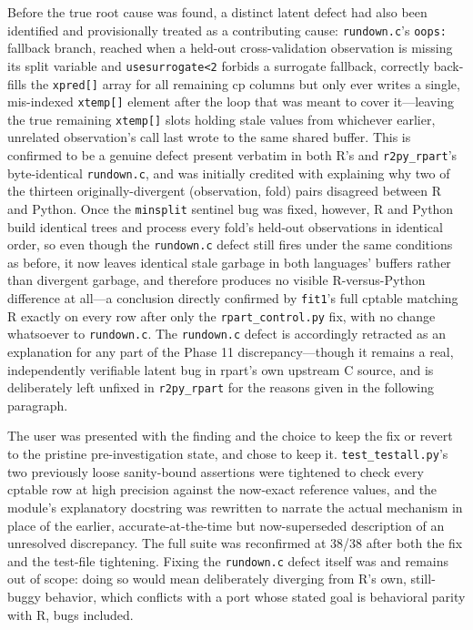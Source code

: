 \documentclass[12pt]{article}
\begin{document}
Before the true root cause was found, a distinct latent defect had also been identified and provisionally treated as a contributing cause: \texttt{rundown.c}'s \texttt{oops:} fallback branch, reached when a held-out cross-validation observation is missing its split variable and \texttt{usesurrogate<2} forbids a surrogate fallback, correctly back-fills the \texttt{xpred[]} array for all remaining cp columns but only ever writes a single, mis-indexed \texttt{xtemp[]} element after the loop that was meant to cover it---leaving the true remaining \texttt{xtemp[]} slots holding stale values from whichever earlier, unrelated observation's call last wrote to the same shared buffer. This is confirmed to be a genuine defect present verbatim in both R's and \texttt{r2py\_rpart}'s byte-identical \texttt{rundown.c}, and was initially credited with explaining why two of the thirteen originally-divergent (observation, fold) pairs disagreed between R and Python. Once the \texttt{minsplit} sentinel bug was fixed, however, R and Python build identical trees and process every fold's held-out observations in identical order, so even though the \texttt{rundown.c} defect still fires under the same conditions as before, it now leaves identical stale garbage in both languages' buffers rather than divergent garbage, and therefore produces no visible R-versus-Python difference at all---a conclusion directly confirmed by \texttt{fit1}'s full cptable matching R exactly on every row after only the \texttt{rpart\_control.py} fix, with no change whatsoever to \texttt{rundown.c}. The \texttt{rundown.c} defect is accordingly retracted as an explanation for any part of the Phase 11 discrepancy---though it remains a real, independently verifiable latent bug in rpart's own upstream C source, and is deliberately left unfixed in \texttt{r2py\_rpart} for the reasons given in the following paragraph.

The user was presented with the finding and the choice to keep the fix or revert to the pristine pre-investigation state, and chose to keep it. \texttt{test\_testall.py}'s two previously loose sanity-bound assertions were tightened to check every cptable row at high precision against the now-exact reference values, and the module's explanatory docstring was rewritten to narrate the actual mechanism in place of the earlier, accurate-at-the-time but now-superseded description of an unresolved discrepancy. The full suite was reconfirmed at 38/38 after both the fix and the test-file tightening. Fixing the \texttt{rundown.c} defect itself was and remains out of scope: doing so would mean deliberately diverging from R's own, still-buggy behavior, which conflicts with a port whose stated goal is behavioral parity with R, bugs included.
\end{document}
